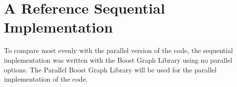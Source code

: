 \section{A Reference Sequential Implementation}\label{sec:sequential-implementation-\myInitials}

To compare most evenly with the parallel version of the code, the sequential implementation was written with the Boost Graph Library using no parallel options. The Parallel Boost Graph Library will be used for the parallel implementation of the code.